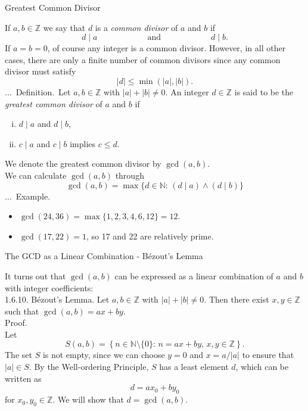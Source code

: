 \documentclass[smaller,hyperref={CJKbookmarks=true}]{beamer}
\newcommand{\N}{\mathbb{N}} \newcommand{\Z}{\mathbb{Z}} \newcommand{\Q}{\mathbb{Q}}
\newcounter{zhuo}[subsection]
\renewcommand{\thezhuo}{\thesection.\thesubsection.\arabic{zhuo}}
\newenvironment{DEFINITION}{\stepcounter{zhuo}\alert{\thezhuo.~Definition.\,}}{}
\newenvironment{EXAMPLE}{\stepcounter{zhuo}\alert{\!\thezhuo.~Example.\,}}{}
\begin{document}
\begin{frame}{Greatest Common Divisor}
\begin{spacing}{1.1}
\vspace*{10pt}
If $a,b\in\Z$ we say that $d$ is a \emph{common divisor} of $a$ and $b$ if
\[d\mid a\qquad\qquad\qquad
\text{and}\qquad\qquad\qquad
d\mid b.\]
If $a=b=0$, of course any integer is a common divisor. However, in all
other cases, there are only a finite number of common divisors since any
common divisor must satisfy\\[5pt]
\[|d|\leq\min(|a|,|b|).\]
\newpage
\begin{DEFINITION}
Let $a,b\in\Z$ with $|a|+|b|\neq0$. An integer $d\in\Z$ is said to be the \emph{greatest common divisor} of $a$ and $b$ if
\begin{enumerate}[(i)]
  \item $d\mid a$ and $d\mid b$,
  \item $c\mid a$ and $c\mid b$ implies $c\leq d$.
\end{enumerate}
We denote the greatest common divisor by $\gcd(a,b)$.\\[4pt]
We can calculate $\gcd(a,b)$ through
\[\gcd(a,b)=\max\{d\in\N\!:\,(d\mid a)\wedge(d\mid b)\}\]
\end{DEFINITION}
\begin{EXAMPLE}
\begin{itemize}
  \item $\gcd(24,36)=\max\{1,2,3,4,6,12\}=12$.
  \item $\gcd(17,22)=1$, so 17 and 22 are relatively prime.
\end{itemize}
\end{EXAMPLE}
\end{spacing}
\end{frame}
\begin{frame}[t,label=1.6.10]{The GCD as a Linear Combination - B\'{e}zout's Lemma}
\begin{spacing}{1.1}
It turns out that $\gcd(a,b)$ can be expressed as a linear combination of $a$ and $b$ with integer coefficients:\\[4pt]
\alert{1.6.10. B\'{e}zout's Lemma.} Let $a,b\in\Z$ with $|a|+|b|\neq0$. Then there exist $x,y\in\Z$ such that $\gcd(a,b)=ax+by$.\\[4pt]
\alert{Proof.}\\
Let
\[S(a,b)=\left\{n\in\N\setminus\{0\}:\,n=ax+by,\,
x,y\in\Z\right\}.\]
The set $S$ is not empty, since we can choose $y=0$ and $x=a/|a|$ to ensure that $|a|\in S$. By the Well-ordering Principle, $S$ has a least element $d$, which can be written as
\[d=ax_0+by_0\]
for $x_0,y_0\in\Z$. We will show that $d=\gcd(a,b)$.
\end{spacing}
\end{frame}
\end{document}
